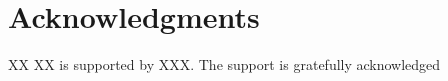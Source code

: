 \documentclass{sig-alternate-05-2015}
\begin{document}
\section{Acknowledgments}
XX XX is supported by XXX. The support
is gratefully acknowledged
%

%
%


\end{document}

